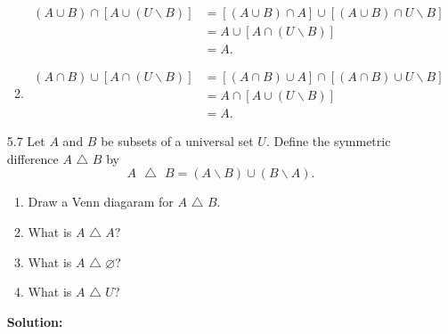 \begin{enumerate}
\begin{enumerate}
\begin{align*}
                  (A \cup B) \cap [A \cup (U{\backslash}B)]
                     &= [(A \cup B) \cap A] \cup
                        [(A \cup B) \cap U{\backslash}B] \\
                     &= A \cup [A \cap (U{\backslash}B)] \\
                     &= A.
               \end{align*}
         \item \begin{align*}
                  (A \cap B) \cup [A \cap (U{\backslash}B)]
                     &= [(A \cap B) \cup A] \cap
                        [(A \cap B) \cup U{\backslash}B] \\
                     &= A \cap [A \cup (U{\backslash}B)] \\
                     &= A.
               \end{align*}
      \end{enumerate}
   \item[5.7]  Let $A$ and $B$ be subsets of a universal set $U$. Define the
               symmetric difference $A$ $\triangle$ $B$ by
               $$A\mbox{ }\triangle\mbox{ }B =
                 (A{\backslash}B) \cup (B{\backslash}A).$$
               \begin{enumerate}
                  \item Draw a Venn diagaram for $A$ $\triangle$ $B$.
                  \item What is $A$ $\triangle$ $A$?
                  \item What is $A$ $\triangle$ $\varnothing$?
                  \item What is $A$ $\triangle$ $U$?
               \end{enumerate}
               
      \textbf{Solution:}
      

\end{enumerate}
